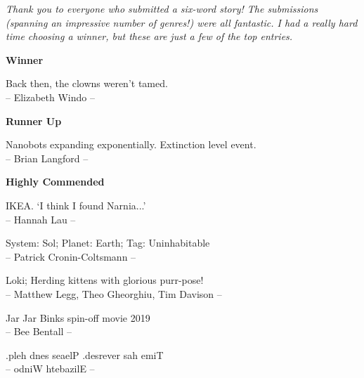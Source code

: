 \emph{Thank you to everyone who submitted a six-word story! The submissions (spanning an impressive number of genres!) were all fantastic. I had a really hard time choosing a winner, but these are just a few of the top entries.}

\vspace{5mm}

\begin{center}

{\bf {\large Winner}}

\vspace{3mm}

Back then, the clowns weren't tamed.\\
-- Elizabeth Windo --

\vspace{10mm}

{\bf {\large Runner Up}}

\vspace{3mm}

Nanobots expanding exponentially. Extinction level event.\\
-- Brian Langford --

\vspace{10mm}

{\bf {\large Highly Commended}}

\vspace{5mm}

IKEA. `I think I found Narnia...'\\
-- Hannah Lau --

\vspace{5mm}

System: Sol; Planet: Earth; Tag: Uninhabitable\\
-- Patrick Cronin-Coltsmann --

\vspace{5mm}

Loki; Herding kittens with glorious purr-pose!\\
-- Matthew Legg, Theo Gheorghiu, Tim Davison --

\vspace{5mm}

Jar Jar Binks spin-off movie 2019\\
-- Bee Bentall --

\vspace{5mm}

.pleh dnes seaelP .desrever sah emiT\\
-- odniW htebazilE --
\end{center}